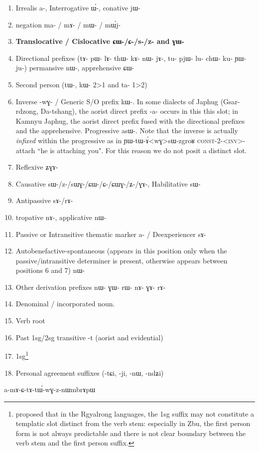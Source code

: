 \documentclass[oldfontcommands,oneside,a4paper,11pt]{memoir}
\newcommand{\ipa}[1]{{\phon #1}} %
\newcommand{\const}{\textsc{const}}
\newcommand{\inv}{\textsc{inv}}
\begin{document}
\begin{enumerate}


\item Irrealis  a-, Interrogative ɯ́-, conative jɯ-
\item negation ma- / mɤ- / mɯ- / mɯ́j-
\item \textbf{Translocative / Cislocative ɕɯ-/ɕ-/s-/z- and ɣɯ-}
\item Directional prefixes (tɤ- pɯ- lɤ- thɯ- kɤ- nɯ- jɤ-, tu- pjɯ- lu- chɯ- ku- ɲɯ- ju-) permansive nɯ-, apprehensive ɕɯ-
\item Second person (tɯ-, kɯ- 2>1 and ta- 1>2)
\item Inverse -wɣ- / Generic S/O prefix kɯ-. In some dialects of Japhug (Gsar-rdzong, Da-tshang), the aorist direct prefix -a- occurs in this this slot; in Kamnyu Japhug, the aorist direct prefix fused with the directional prefixes and the apprehensive. Progressive \ipa{asɯ}-. Note that the inverse is actually \textit{infixed} within the progressive as in \ipa{ɲɯ-tɯ-ɤ́<wɣ>sɯ-zgroʁ} \const{}-2-\prog{}<\inv{}>-attach ``he is attaching you". For this reason we do not posit a distinct slot.
\item Reflexive ʑɣɤ-  
\item Causative sɯ-/z-/sɯɣ-/ɕɯ-/ɕ-/ɕɯɣ-/ʑ-/ɣɤ-, Habilitative sɯ-
\item  Antipassive  sɤ-/rɤ-
\item tropative nɤ-, applicative nɯ-
\item Passive or Intransitive thematic marker a- / Deexperiencer sɤ-
\item Autobenefactive-spontaneous (appears in this position only when the passive/intransitive determiner is present, otherwise appears between positions 6 and 7) nɯ-
\item Other derivation prefixes nɯ- ɣɯ- rɯ- nɤ- ɣɤ- rɤ-
\item Denominal / incorporated noun.  
\item Verb root 
\item Past 1sg/2sg transitive -t (aorist and evidential)
\item 1sg\footnote{\citet{gongxun} proposed that  in the Rgyalrong languages, the 1sg suffix may not constitute a templatic slot distinct from the verb stem: especially in Zbu, the first person form is not always predictable and there is not clear boundary between the verb stem and the first person suffix.}

\item Personal agreement suffixes (-tɕi, -ji, -nɯ, -ndʑi)
\end{enumerate}
a-mɤ-ɕ-tɤ-tɯ́-wɣ-z-nɯmbrɤpɯ
\end{document}
